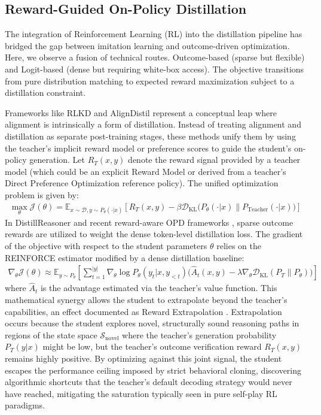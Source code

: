 \documentclass{article} %
\begin{document}
\subsection{Reward-Guided On-Policy Distillation}
The integration of Reinforcement Learning (RL) into the distillation pipeline has bridged the gap between imitation learning and outcome-driven optimization. Here, we observe a fusion of technical routes. Outcome-based (sparse but flexible) and Logit-based (dense but requiring white-box access). The objective transitions from pure distribution matching to expected reward maximization subject to a distillation constraint.

Frameworks like RLKD \citep{2505.16142} and AlignDistil \citep{2503.02832} represent a conceptual leap where alignment is intrinsically a form of distillation. Instead of treating alignment and distillation as separate post-training stages, these methods unify them by using the teacher's implicit reward model or preference scores to guide the student's on-policy generation. Let $R_T(x, y)$ denote the reward signal provided by a teacher model (which could be an explicit Reward Model or derived from a teacher's Direct Preference Optimization reference policy). The unified optimization problem is given by:
\begin{align}
\max_{\theta} \mathcal{J}(\theta) = \mathbb{E}_{x \sim \mathcal{D}, y \sim P_\theta(\cdot|x)} \left[ R_T(x, y) - \beta \mathcal{D}_{\text{KL}}\big(P_\theta(\cdot|x) \parallel P_{\text{Teacher}}(\cdot|x)\big) \right] \label{eq:rlkd}
\end{align}
In DistillReasoner \citep{2408.06037} and recent reward-aware OPD frameworks \citep{2503.04711}, sparse outcome rewards are utilized to weight the dense token-level distillation loss. The gradient of the objective with respect to the student parameters $\theta$ relies on the REINFORCE estimator modified by a dense distillation baseline:
\begin{align}
\nabla_\theta \mathcal{J}(\theta) \approx \mathbb{E}_{y \sim P_\theta} \left[ \sum_{t=1}^{|y|} \nabla_\theta \log P_\theta(y_t | x, y_{<t}) \Big( \hat{A}_t(x, y) - \lambda \nabla_\theta \mathcal{D}_{\text{KL}}(P_T \parallel P_\theta) \Big) \right]
\end{align}
where $\hat{A}_t$ is the advantage estimated via the teacher's value function. This mathematical synergy allows the student to extrapolate beyond the teacher's capabilities, an effect documented as Reward Extrapolation \citep{2602.12125}. Extrapolation occurs because the student explores novel, structurally sound reasoning paths in regions of the state space $\mathcal{S}_{\text{novel}}$ where the teacher's generation probability $P_T(y|x)$ might be low, but the teacher's outcome verification reward $R_T(x, y)$ remains highly positive. By optimizing against this joint signal, the student escapes the performance ceiling imposed by strict behavioral cloning, discovering algorithmic shortcuts that the teacher's default decoding strategy would never have reached, mitigating the saturation typically seen in pure self-play RL paradigms.
\end{document}
